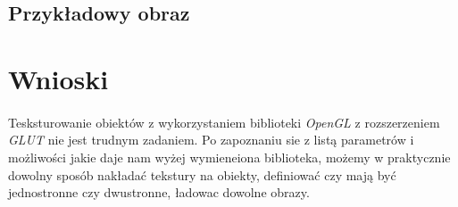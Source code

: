 \documentclass[wide,a4paper,titlepage,12pt] {article}
\begin{document}
\subsection{Przykładowy obraz}


\newpage
\section{Wnioski}
\paragraph{}
Tesksturowanie obiektów z wykorzystaniem biblioteki \textit{OpenGL} z rozszerzeniem \textit{GLUT} nie jest trudnym zadaniem. Po zapoznaniu sie z listą parametrów i możliwości jakie daje nam wyżej wymieneiona biblioteka, możemy w praktycznie dowolny sposób nakładać tekstury na obiekty, definiować czy mają być jednostronne czy dwustronne, ładowac dowolne obrazy.
\end{document}
